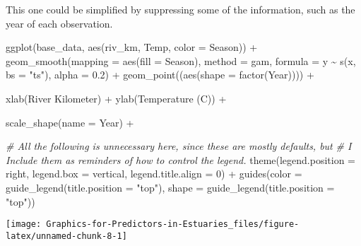 \documentclass[
]{article}
\newenvironment{Shaded}{\begin{snugshade}}{\end{snugshade}}
\newcommand{\AttributeTok}[1]{\textcolor[rgb]{0.77,0.63,0.00}{#1}}
\newcommand{\CommentTok}[1]{\textcolor[rgb]{0.56,0.35,0.01}{\textit{#1}}}
\newcommand{\DecValTok}[1]{\textcolor[rgb]{0.00,0.00,0.81}{#1}}
\newcommand{\FloatTok}[1]{\textcolor[rgb]{0.00,0.00,0.81}{#1}}
\newcommand{\FunctionTok}[1]{\textcolor[rgb]{0.00,0.00,0.00}{#1}}
\newcommand{\NormalTok}[1]{#1}
\newcommand{\SpecialCharTok}[1]{\textcolor[rgb]{0.00,0.00,0.00}{#1}}
\newcommand{\StringTok}[1]{\textcolor[rgb]{0.31,0.60,0.02}{#1}}
\begin{document}
This one could be simplified by suppressing some of the information,
such as the year of each observation.

\begin{Shaded}
\begin{Highlighting}[]
\FunctionTok{ggplot}\NormalTok{(base\_data, }\FunctionTok{aes}\NormalTok{(riv\_km, Temp, }\AttributeTok{color =}\NormalTok{ Season)) }\SpecialCharTok{+}
  \FunctionTok{geom\_smooth}\NormalTok{(}\AttributeTok{mapping =} \FunctionTok{aes}\NormalTok{(}\AttributeTok{fill =}\NormalTok{ Season), }
              \AttributeTok{method =} \StringTok{\textquotesingle{}gam\textquotesingle{}}\NormalTok{, }
              \AttributeTok{formula =}\NormalTok{ y }\SpecialCharTok{\textasciitilde{}} \FunctionTok{s}\NormalTok{(x, }\AttributeTok{bs =} \StringTok{"ts"}\NormalTok{),}
              \AttributeTok{alpha =} \FloatTok{0.2}\NormalTok{) }\SpecialCharTok{+}
  \FunctionTok{geom\_point}\NormalTok{((}\FunctionTok{aes}\NormalTok{(}\AttributeTok{shape =} \FunctionTok{factor}\NormalTok{(Year)))) }\SpecialCharTok{+}

  \FunctionTok{xlab}\NormalTok{(}\StringTok{\textquotesingle{}River Kilometer\textquotesingle{}}\NormalTok{) }\SpecialCharTok{+}
  \FunctionTok{ylab}\NormalTok{(}\StringTok{\textquotesingle{}Temperature (C)\textquotesingle{}}\NormalTok{) }\SpecialCharTok{+}
  
  \FunctionTok{scale\_shape}\NormalTok{(}\AttributeTok{name =} \StringTok{\textquotesingle{}Year\textquotesingle{}}\NormalTok{) }\SpecialCharTok{+}
  
  \CommentTok{\# All the following is unnecessary here, since  these are mostly defaults, but}
  \CommentTok{\# I Include them as reminders of how to control the legend.}
  \FunctionTok{theme}\NormalTok{(}\AttributeTok{legend.position =} \StringTok{\textquotesingle{}right\textquotesingle{}}\NormalTok{, }
        \AttributeTok{legend.box =} \StringTok{\textquotesingle{}vertical\textquotesingle{}}\NormalTok{,}
        \AttributeTok{legend.title.align =} \DecValTok{0}\NormalTok{) }\SpecialCharTok{+}
  \FunctionTok{guides}\NormalTok{(}\AttributeTok{color =} \FunctionTok{guide\_legend}\NormalTok{(}\AttributeTok{title.position =} \StringTok{"top"}\NormalTok{),}
         \AttributeTok{shape =} \FunctionTok{guide\_legend}\NormalTok{(}\AttributeTok{title.position =} \StringTok{"top"}\NormalTok{))}
\end{Highlighting}
\end{Shaded}

\begin{center}\texttt{[image: Graphics-for-Predictors-in-Estuaries\_files/figure-latex/unnamed-chunk-8-1]} \end{center}
\end{document}
